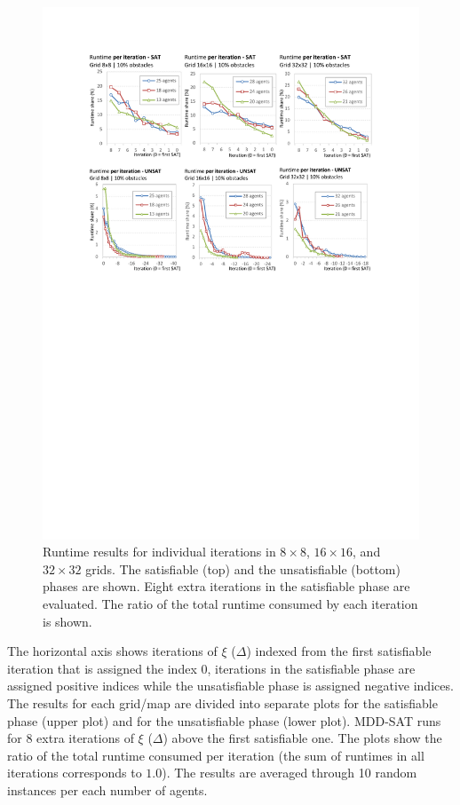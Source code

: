 \documentclass[jair,oneside,11pt]{article}
\begin{document}
\begin{figure}[h]
\centering
\includegraphics[trim={2.5cm 15.0cm 2.5cm 2.6cm},clip,width=1.0\textwidth]{exprMI_iter_grids.pdf}
\vspace{-0.6cm}\caption{Runtime results for individual iterations in  $8{}\times{}8$, $16{}\times{}16$, and $32{}\times{}32$ grids. The satisfiable (top) and the unsatisfiable (bottom) phases are shown. Eight extra iterations in the satisfiable phase are evaluated. The ratio of the total runtime consumed by each iteration is shown. }
\label{figure-iter-grids}
\end{figure}

The horizontal axis shows iterations of $\xi$ ($\Delta$) indexed from the first satisfiable iteration that is assigned the index 0, iterations in the satisfiable phase are assigned positive indices while the unsatisfiable phase is assigned negative indices. The results for each grid/map are divided into separate plots for the satisfiable phase (upper plot) and for the unsatisfiable phase (lower plot). MDD-SAT runs for 8 extra iterations of $\xi$ ($\Delta$) above the first satisfiable one. The plots show the ratio of the total runtime consumed per iteration (the sum of runtimes in all iterations corresponds to $1.0$). The results are averaged through 10 random instances per each number of agents.
\end{document}
